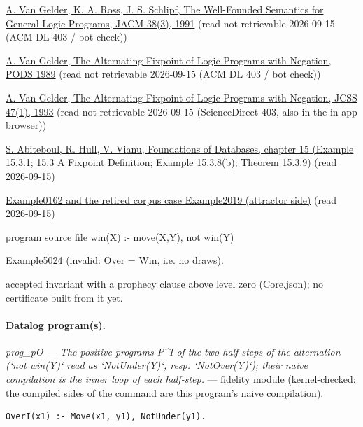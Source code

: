 \documentclass[10pt]{article}
\begin{document}
\begin{description}[leftmargin=2.6cm,style=nextline,itemsep=1pt]
\item[Sources] {\raggedright \href{https://doi.org/10.1145/116825.116838}{A. Van Gelder, K. A. Ross, J. S. Schlipf, The Well-Founded Semantics for General Logic Programs, JACM 38(3), 1991} (read not retrievable 2026-09-15 (ACM DL 403 / bot check)) \par \href{https://doi.org/10.1145/73721.73722}{A. Van Gelder, The Alternating Fixpoint of Logic Programs with Negation, PODS 1989} (read not retrievable 2026-09-15 (ACM DL 403 / bot check)) \par \href{https://doi.org/10.1016/0022-0000(93)90024-Q}{A. Van Gelder, The Alternating Fixpoint of Logic Programs with Negation, JCSS 47(1), 1993} (read not retrievable 2026-09-15 (ScienceDirect 403, also in the in-app browser)) \par \href{http://webdam.inria.fr/Alice/pdfs/Chapter-15.pdf}{S. Abiteboul, R. Hull, V. Vianu, Foundations of Databases, chapter 15 (Example 15.3.1; 15.3 A Fixpoint Definition; Example 15.3.8(b); Theorem 15.3.9)} (read 2026-09-15) \par \href{local}{Example0162 and the retired corpus case Example2019 (attractor side)} (read 2026-09-15) \par program source file win(X) :- move(X,Y), not win(Y)\par}

\item[Twin] Example5024 (invalid: Over = Win, i.e. no draws).

\item[Prophecy] accepted invariant with a prophecy clause above level zero (Core.json); no certificate built from it yet.

\end{description}

\paragraph{Datalog program(s).}

{\raggedright\textit{prog\_pO --- The positive programs P\textasciicircum{}I of the two half-steps of the alternation (`not win(Y)` read as `NotUnder(Y)`, resp. `NotOver(Y)`); their naive compilation is the inner loop of each half-step.} --- fidelity module (kernel-checked: the compiled sides of the command are this program's naive compilation).\par}

\begin{Verbatim}[fontsize=\scriptsize,breaklines=true,breakanywhere=true,frame=single,framesep=1.5mm]
OverI(x1) :- Move(x1, y1), NotUnder(y1).
\end{Verbatim}
\end{document}

